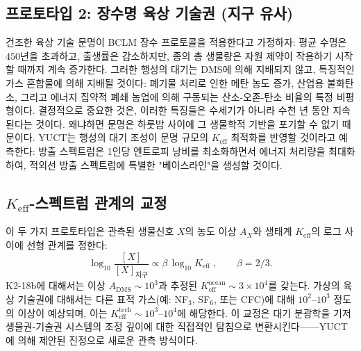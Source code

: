 \documentclass[11pt,a4paper]{article}
\begin{document}
	\subsection{프로토타입 2: 장수명 육상 기술권 (지구 유사)}
	건조한 육상 기술 문명이 BCLM 장수 프로토콜을 적용한다고 가정하자: 평균 수명은 \(450\)년을 초과하고, 출생률은 감소하지만, 종의 총 생물량은 자원 제약이 작용하기 시작할 때까지 계속 증가한다. 그러한 행성의 대기는 DMS에 의해 지배되지 않고, 특징적인 가스 혼합물에 의해 지배될 것이다: 폐기물 처리로 인한 메탄 농도 증가, 산업용 불화탄소, 그리고 에너지 집약적 폐쇄 농업에 의해 구동되는 산소-오존-탄소 비율의 특정 비평형이다. 결정적으로 중요한 것은, 이러한 특징들은 수세기가 아니라 수천 년 동안 지속된다는 것이다. 왜냐하면 문명은 하룻밤 사이에 그 생물학적 기반을 포기할 수 없기 때문이다. YUCT는 행성의 대기 조성이 문명 규모의 \(K_{\mathrm{eff}}\) 최적화를 반영할 것이라고 예측한다: 방출 스펙트럼은 1인당 엔트로피 낭비를 최소화하면서 에너지 처리량을 최대화하여, 적외선 방출 스펙트럼에 특별한 "베이스라인"을 생성할 것이다.
	
	\subsection{\(K_{\mathrm{eff}}\)-스펙트럼 관계의 교정}
	이 두 가지 프로토타입은 관측된 생물신호 \(X\)의 농도 이상 \(A_X\)와 생태계 \(K_{\mathrm{eff}}\)의 로그 사이에 선형 관계를 정한다:
	\begin{equation}
		\log_{10} \frac{[X]}{[X]_{\mathrm{지구}}} \propto
		\beta\,\log_{10} K_{\mathrm{eff}} \; , \qquad \beta = 2/3 .
	\end{equation}
	K2-18b에 대해서는 이상 \(A_{\mathrm{DMS}} \sim 10^3\)과 추정된 \(K_{\mathrm{eff}}^{\mathrm{ocean}} \sim 3\times10^4\)를 갖는다. 가상의 육상 기술권에 대해서는 다른 표적 가스(예: NF$_3$, SF$_6$, 또는 CFC)에 대해 \(10^2\)–\(10^3\) 정도의 이상이 예상되며, 이는 \(K_{\mathrm{eff}}^{\mathrm{tech}} \sim 10^3\)–\(10^4\)에 해당한다. 이 교정은 대기 분광학을 기저 생물권-기술권 시스템의 조정 깊이에 대한 직접적인 탐침으로 변환시킨다——YUCT에 의해 제안된 진정으로 새로운 관측 방식이다.
	
\end{document}
